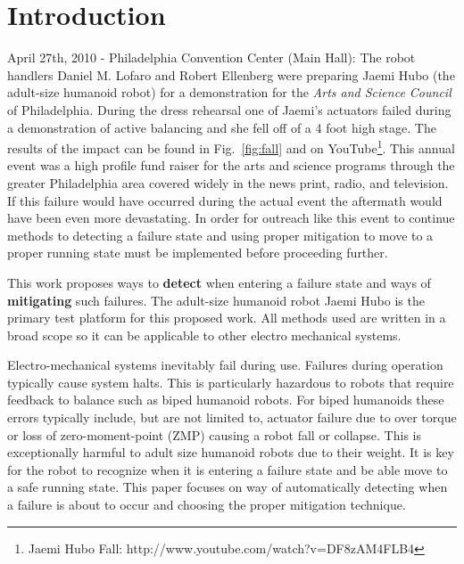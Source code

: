 \section{Introduction}

April 27th, 2010 - Philadelphia Convention Center (Main Hall):  The robot handlers Daniel M. Lofaro and Robert Ellenberg were preparing Jaemi Hubo (the adult-size humanoid robot) for a demonstration for the \textit{Arts and Science Council} of Philadelphia.  During the dress rehearsal one of Jaemi's actuators failed during a demonstration of active balancing and she fell off of a 4 foot high stage.  The results of the impact can be found in Fig.~\ref{fig:fall} and on YouTube\footnote{Jaemi Hubo Fall: http://www.youtube.com/watch?v=DF8zAM4FLB4}\label{link:fall}.  This annual event was a high profile fund raiser for the arts and science programs through the greater Philadelphia area covered widely in the news print, radio, and television.  If this failure would have occurred during the actual event the aftermath would have been even more devastating.  In order for outreach like this event to continue methods to detecting a failure state and using proper mitigation to move to a proper running state must be implemented before proceeding further.  

This work proposes ways to \textbf{detect} when entering a failure state and ways of \textbf{mitigating} such failures.  The adult-size humanoid robot Jaemi Hubo is the primary test platform for this proposed work.  All methods used are written in a broad scope so it can be applicable to other electro mechanical systems.




Electro-mechanical systems inevitably fail during use.  Failures during operation typically cause system halts.  This is particularly hazardous to robots that require feedback to balance such as biped humanoid robots.  For biped humanoids these errors typically include, but are not limited to, actuator failure due to over torque or loss of zero-moment-point (ZMP) \cite{zmp35} causing a robot fall or collapse.  This is exceptionally harmful to adult size humanoid robots due to their weight.  It is key for the robot to recognize when it is entering a failure state and be able move to a safe running state.  This paper focuses on way of automatically detecting when a failure is about to occur and choosing the proper mitigation technique.

